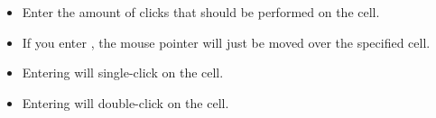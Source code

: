 
\begin{itemize}
\item Enter the amount of clicks that should be performed on the cell.
\item If you enter , the mouse pointer will just be moved over the specified cell.
\item Entering  will single-click on the cell.
\item Entering  will double-click on the cell. 
\end{itemize}
